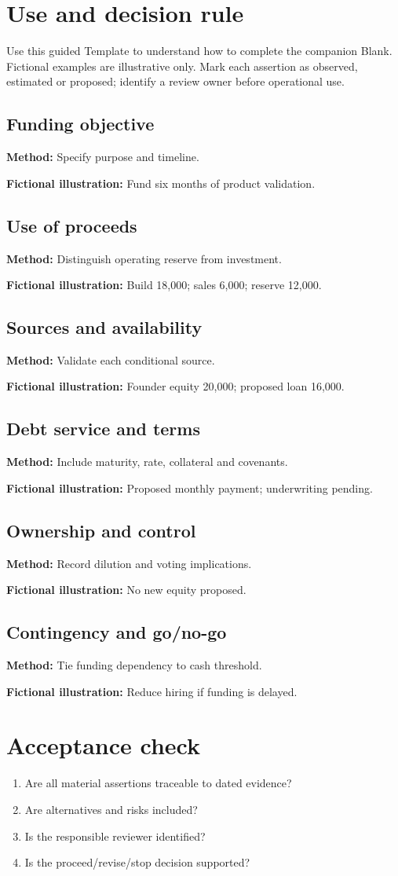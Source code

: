 \documentclass[11pt]{article}
\begin{document}
\SuiteOpen
\section{Use and decision rule}
Use this guided Template to understand how to complete the companion Blank. Fictional examples are illustrative only. Mark each assertion as observed, estimated or proposed; identify a review owner before operational use.
\subsection*{Funding objective}
\textbf{Method:} Specify purpose and timeline.\par\textbf{Fictional illustration:} Fund six months of product validation.\par
\subsection*{Use of proceeds}
\textbf{Method:} Distinguish operating reserve from investment.\par\textbf{Fictional illustration:} Build 18,000; sales 6,000; reserve 12,000.\par
\subsection*{Sources and availability}
\textbf{Method:} Validate each conditional source.\par\textbf{Fictional illustration:} Founder equity 20,000; proposed loan 16,000.\par
\subsection*{Debt service and terms}
\textbf{Method:} Include maturity, rate, collateral and covenants.\par\textbf{Fictional illustration:} Proposed monthly payment; underwriting pending.\par
\subsection*{Ownership and control}
\textbf{Method:} Record dilution and voting implications.\par\textbf{Fictional illustration:} No new equity proposed.\par
\subsection*{Contingency and go/no-go}
\textbf{Method:} Tie funding dependency to cash threshold.\par\textbf{Fictional illustration:} Reduce hiring if funding is delayed.\par
\section{Acceptance check}
\begin{enumerate}[leftmargin=*,itemsep=5pt]
\item Are all material assertions traceable to dated evidence?
\item Are alternatives and risks included?
\item Is the responsible reviewer identified?
\item Is the proceed/revise/stop decision supported?
\end{enumerate}
\end{document}
